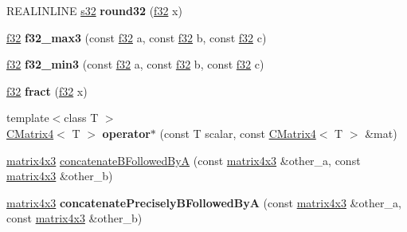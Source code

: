 \begin{DoxyCompactItemize}
\item 
R\+E\+A\+L\+I\+N\+L\+I\+NE \hyperlink{namespaceirr_ac66849b7a6ed16e30ebede579f9b47c6}{s32} {\bfseries round32} (\hyperlink{namespaceirr_a0277be98d67dc26ff93b1a6a1d086b07}{f32} x)\hypertarget{namespaceirr_1_1core_ae46f57f03e9033c57c180fbe83b04cf2}{}\label{namespaceirr_1_1core_ae46f57f03e9033c57c180fbe83b04cf2}

\item 
\hyperlink{namespaceirr_a0277be98d67dc26ff93b1a6a1d086b07}{f32} {\bfseries f32\+\_\+max3} (const \hyperlink{namespaceirr_a0277be98d67dc26ff93b1a6a1d086b07}{f32} a, const \hyperlink{namespaceirr_a0277be98d67dc26ff93b1a6a1d086b07}{f32} b, const \hyperlink{namespaceirr_a0277be98d67dc26ff93b1a6a1d086b07}{f32} c)\hypertarget{namespaceirr_1_1core_a944684da42c3118ebe85ec9c3f77c331}{}\label{namespaceirr_1_1core_a944684da42c3118ebe85ec9c3f77c331}

\item 
\hyperlink{namespaceirr_a0277be98d67dc26ff93b1a6a1d086b07}{f32} {\bfseries f32\+\_\+min3} (const \hyperlink{namespaceirr_a0277be98d67dc26ff93b1a6a1d086b07}{f32} a, const \hyperlink{namespaceirr_a0277be98d67dc26ff93b1a6a1d086b07}{f32} b, const \hyperlink{namespaceirr_a0277be98d67dc26ff93b1a6a1d086b07}{f32} c)\hypertarget{namespaceirr_1_1core_a8d7bec533c867b22d0e870236ecf4bad}{}\label{namespaceirr_1_1core_a8d7bec533c867b22d0e870236ecf4bad}

\item 
\hyperlink{namespaceirr_a0277be98d67dc26ff93b1a6a1d086b07}{f32} {\bfseries fract} (\hyperlink{namespaceirr_a0277be98d67dc26ff93b1a6a1d086b07}{f32} x)\hypertarget{namespaceirr_1_1core_adf530866e57502da85e6a1f0c23932a2}{}\label{namespaceirr_1_1core_adf530866e57502da85e6a1f0c23932a2}

\item 
{\footnotesize template$<$class T $>$ }\\\hyperlink{classirr_1_1core_1_1CMatrix4}{C\+Matrix4}$<$ T $>$ {\bfseries operator$\ast$} (const T scalar, const \hyperlink{classirr_1_1core_1_1CMatrix4}{C\+Matrix4}$<$ T $>$ \&mat)\hypertarget{namespaceirr_1_1core_abb387ec6f0f654c7ee704345bdded96c}{}\label{namespaceirr_1_1core_abb387ec6f0f654c7ee704345bdded96c}

\item 
\hyperlink{classirr_1_1core_1_1matrix4x3}{matrix4x3} \hyperlink{namespaceirr_1_1core_a99d74fc1e9ca63dde2f5386514fca2d9}{concatenate\+B\+Followed\+ByA} (const \hyperlink{classirr_1_1core_1_1matrix4x3}{matrix4x3} \&other\+\_\+a, const \hyperlink{classirr_1_1core_1_1matrix4x3}{matrix4x3} \&other\+\_\+b)
\item 
\hyperlink{classirr_1_1core_1_1matrix4x3}{matrix4x3} {\bfseries concatenate\+Precisely\+B\+Followed\+ByA} (const \hyperlink{classirr_1_1core_1_1matrix4x3}{matrix4x3} \&other\+\_\+a, const \hyperlink{classirr_1_1core_1_1matrix4x3}{matrix4x3} \&other\+\_\+b)\hypertarget{namespaceirr_1_1core_aecf75f60b7c82f906d09574c4464e2c5}{}\label{namespaceirr_1_1core_aecf75f60b7c82f906d09574c4464e2c5}


\end{DoxyCompactItemize}
